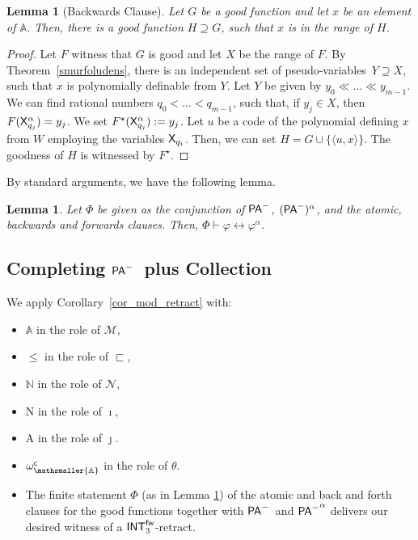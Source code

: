 \documentclass{amsart}
\renewcommand{\iff}{\leftrightarrow}
\renewcommand{\leq}{\leqslant}
\renewcommand{\phi}{\varphi}
\renewcommand{\Phi}{\varPhi}
\newtheorem{lem}[theorem]{Lemma}
\newcommand{\mc}[1]{\mathcal #1}
\newcommand{\tupel}[1]{{\langle #1 \rangle}}
\newcommand{\verz}[1]{\{ #1 \}}
\newcommand{\pam}{\ensuremath{{\sf PA}^{-}}}
\newcommand{\belowz}{\sqsubset}
\newcommand{\X}{{\sf X}}
\newcommand{\mbbs}[1]{\ensuremath{\mathsmaller{\mathbb{#1}}}}
\newcommand{\psvar}{pseudo-variables}
\begin{document}
\begin{lem}[Backwards Clause]
Let $G$ be a good function and let $x$ be an element of $\mathbb A$.
Then, there is a good function $H \supseteq G$, such that $x$ is in the range of
$H$.
\end{lem}

\begin{proof}
Let $F$ witness that $G$ is good and let $X$ be the range of $F$. 
By Theorem~\ref{smurfoludens}, there is an independent set of 
\psvar\ $Y\supseteq X$, such that $x$ is polynomially definable from $Y$.
Let $Y$ be given by $y_0 \ll \dots \ll y_{m-1}$. We can find rational numbers $q_0<\dots < q_{m-1}$, such that, if
$y_j \in X$, then $F(\X^\alpha_{q_j}) = y_j$. We set $F^\star(\X^\alpha_{q_j}) := y_j$. Let $u$ be a code of the polynomial defining $x$ from $W$ employing the variables $\X_{q_i}$. Then, we can set $H = G\cup \verz{\tupel{u,x}}$.
The goodness of $H$ is witnessed by $F^\star$. 
\end{proof}

By standard arguments, we have the following lemma.
\begin{lem} \label{finite_witnessing}Let $\Phi$ be given as the conjunction of \pam, $({\pam})^\alpha$, and the atomic, backwards and forwards clauses. Then, $\Phi \vdash \phi\iff \phi^\alpha$. 
\end{lem}

\subsection{Completing \pam\ plus Collection}
We  apply Corollary~\ref{cor_mod_retract} with:
\begin{itemize}
    \item 
$\mathbb A$ in the role of $\mc M$, 
\item 
$\leq$ in the role of $\belowz$, 
\item 
$\mathbb N$ in the role of
$\mc N$, 
\item 
{\sf N} in the role of $\imath$,
\item 
{\sf A} in the role of $\jmath$. 
\item
$\omega_{\mbbs A}^{\sf c}$ in the role of $\theta$.
\item 
The finite statement $\Phi$ (as in Lemma \ref{finite_witnessing}) of the atomic and back and forth clauses
for the good functions together with \pam\ and ${\pam}^\alpha$  delivers 
our desired witness of a ${\sf INT}^{\sf fw}_3$-retract.
\end{itemize}
\end{document}
